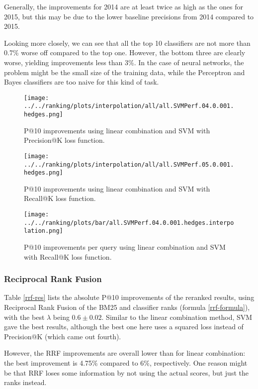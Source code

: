 Generally, the improvements for 2014 are at least 
twice as high as the ones for 2015, but this may be due to the lower baseline precisions from 2014 compared to 2015.

Looking more closely, we can see that all the top 10 classifiers are not more than 0.7\% worse off compared to the top one. However, the bottom three
are clearly worse, yielding improvements less than 3\%. In the case of neural networks, the problem might be the small size of the training data,
while the Perceptron and Bayes classifiers are too naive for this kind of task.


\begin{figure}
\centerline{
  \texttt{[image: ../../ranking/plots/interpolation/all/all.SVMPerf.04.0.001.hedges.png]}
  }
  \caption{P@10 improvements using linear combination and SVM with Precision@K loss function.}
\end{figure}


\begin{figure}
\centerline{
  \texttt{[image: ../../ranking/plots/interpolation/all/all.SVMPerf.05.0.001.hedges.png]}
  }
  \caption{P@10 improvements using linear combination and SVM with Recall@K loss function.}
\end{figure}

\begin{figure}
\centerline{
  \texttt{[image: ../../ranking/plots/bar/all.SVMPerf.04.0.001.hedges.interpolation.png]}
  }
  \caption{P@10 improvements per query using linear combination and SVM with Recall@K loss function.}
\end{figure}




\subsubsection{Reciprocal Rank Fusion}
Table \ref{rrf-res} lists the absolute P@10 improvements of the reranked results, using Reciprocal Rank Fusion of the BM25 and classifier ranks (formula \ref{rrf-formula}),
with the best $\lambda$ being $0.6\pm 0.02$.
Similar to the linear combination method, SVM gave the best results, although the best one here uses a squared loss instead of 
Precision@K (which came out fourth).

However, the RRF improvements are overall lower than for linear combination: the best improvement is 4.75\% compared to 6\%, respectively. One reason
might be that RRF loses some information by not using the actual scores, but just the ranks instead.

